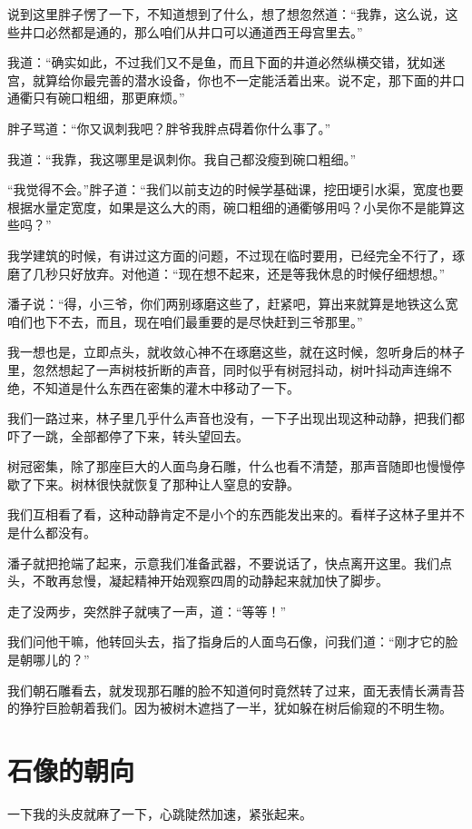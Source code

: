 说到这里胖子愣了一下，不知道想到了什么，想了想忽然道：“我靠，这么说，这些井口必然都是通的，那么咱们从井口可以通道西王母宫里去。”

我道：“确实如此，不过我们又不是鱼，而且下面的井道必然纵横交错，犹如迷宫，就算给你最完善的潜水设备，你也不一定能活着出来。说不定，那下面的井口通衢只有碗口粗细，那更麻烦。”

胖子骂道：“你又讽刺我吧？胖爷我胖点碍着你什么事了。”

我道：“我靠，我这哪里是讽刺你。我自己都没瘦到碗口粗细。”

“我觉得不会。”胖子道：“我们以前支边的时候学基础课，挖田埂引水渠，宽度也要根据水量定宽度，如果是这么大的雨，碗口粗细的通衢够用吗？小吴你不是能算这些吗？”

我学建筑的时候，有讲过这方面的问题，不过现在临时要用，已经完全不行了，琢磨了几秒只好放弃。对他道：“现在想不起来，还是等我休息的时候仔细想想。”

潘子说：“得，小三爷，你们两别琢磨这些了，赶紧吧，算出来就算是地铁这么宽咱们也下不去，而且，现在咱们最重要的是尽快赶到三爷那里。”

我一想也是，立即点头，就收敛心神不在琢磨这些，就在这时候，忽听身后的林子里，忽然想起了一声树枝折断的声音，同时似乎有树冠抖动，树叶抖动声连绵不绝，不知道是什么东西在密集的灌木中移动了一下。

我们一路过来，林子里几乎什么声音也没有，一下子出现出现这种动静，把我们都吓了一跳，全部都停了下来，转头望回去。

树冠密集，除了那座巨大的人面鸟身石雕，什么也看不清楚，那声音随即也慢慢停歇了下来。树林很快就恢复了那种让人窒息的安静。

我们互相看了看，这种动静肯定不是小个的东西能发出来的。看样子这林子里并不是什么都没有。

潘子就把抢端了起来，示意我们准备武器，不要说话了，快点离开这里。我们点头，不敢再怠慢，凝起精神开始观察四周的动静起来就加快了脚步。

走了没两步，突然胖子就咦了一声，道：“等等！”

我们问他干嘛，他转回头去，指了指身后的人面鸟石像，问我们道：“刚才它的脸是朝哪儿的？”

我们朝石雕看去，就发现那石雕的脸不知道何时竟然转了过来，面无表情长满青苔的狰狞巨脸朝着我们。因为被树木遮挡了一半，犹如躲在树后偷窥的不明生物。

\chapter{石像的朝向}

一下我的头皮就麻了一下，心跳陡然加速，紧张起来。


